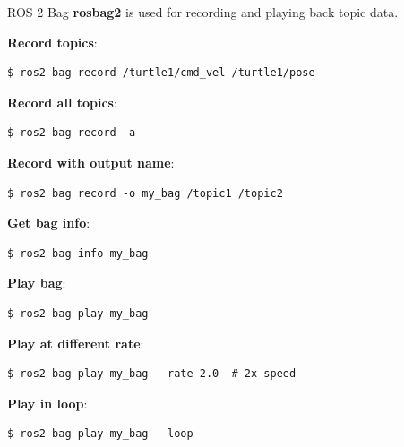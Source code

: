\begin{frame}{ROS 2 Bag}
    \textbf{rosbag2} is used for recording and playing back topic data.

    \textbf{Record topics}:
    \begin{lstlisting}[language=shell]
$ ros2 bag record /turtle1/cmd_vel /turtle1/pose
\end{lstlisting}

    \textbf{Record all topics}:
    \begin{lstlisting}[language=shell]
$ ros2 bag record -a
\end{lstlisting}

    \textbf{Record with output name}:
    \begin{lstlisting}[language=shell]
$ ros2 bag record -o my_bag /topic1 /topic2
\end{lstlisting}

    \framebreak

    \textbf{Get bag info}:
    \begin{lstlisting}[language=shell]
$ ros2 bag info my_bag
\end{lstlisting}

    \textbf{Play bag}:
    \begin{lstlisting}[language=shell]
$ ros2 bag play my_bag
\end{lstlisting}

    \textbf{Play at different rate}:
    \begin{lstlisting}[language=shell]
$ ros2 bag play my_bag --rate 2.0  # 2x speed
\end{lstlisting}

    \textbf{Play in loop}:
    \begin{lstlisting}[language=shell]
$ ros2 bag play my_bag --loop
\end{lstlisting}
\end{frame}

